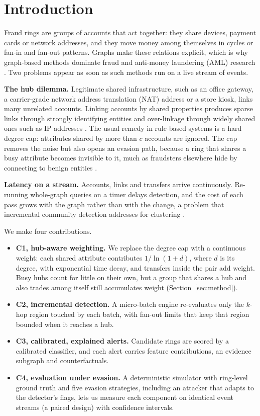 \section{Introduction}
Fraud rings are groups of accounts that act together: they share devices,
payment cards or network addresses, and they move money among themselves in
cycles or fan-in and fan-out patterns. Graphs make these relations explicit,
which is why graph-based methods dominate fraud and anti-money laundering
(AML) research \cite{pourhabibi2020fraud,pan2025gbfrd}. Two problems appear as
soon as such methods run on a live stream of events.

\textbf{The hub dilemma.} Legitimate shared infrastructure, such as an office
gateway, a carrier-grade network address translation (NAT) address or a store
kiosk, links many unrelated accounts. Linking accounts by shared properties
produces sparse links through strongly identifying entities and over-linkage
through widely shared ones such as IP addresses \cite{yin2022behavioral}. The
usual remedy in rule-based systems is a hard degree cap: attributes shared by
more than $c$ accounts are ignored. The cap removes the noise but also opens an
evasion path, because a ring that shares a busy attribute becomes invisible to
it, much as fraudsters elsewhere hide by connecting to benign entities
\cite{liu2025robust}.

\textbf{Latency on a stream.} Accounts, links and transfers arrive
continuously. Re-running whole-graph queries on a timer delays detection, and
the cost of each pass grows with the graph rather than with the change, a
problem that incremental community detection addresses for clustering
\cite{zhang2026incremental,abughofa2021incremental}.

We make four contributions.
\begin{itemize}
\item \textbf{C1, hub-aware weighting.} We replace the degree cap with a
continuous weight: each shared attribute contributes $1/\ln(1+d)$, where $d$ is
its degree, with exponential time decay, and transfers inside the pair add
weight. Busy hubs count for little on their own, but a group that shares a hub
and also trades among itself still accumulates weight (Section~\ref{sec:method}).
\item \textbf{C2, incremental detection.} A micro-batch engine re-evaluates only
the $k$-hop region touched by each batch, with fan-out limits that keep that
region bounded when it reaches a hub.
\item \textbf{C3, calibrated, explained alerts.} Candidate rings are scored by a
calibrated classifier, and each alert carries feature contributions, an
evidence subgraph and counterfactuals.
\item \textbf{C4, evaluation under evasion.} A deterministic simulator with
ring-level ground truth and five evasion strategies, including an attacker that
adapts to the detector's flags, lets us measure each component on identical
event streams (a paired design) with confidence intervals.
\end{itemize}

